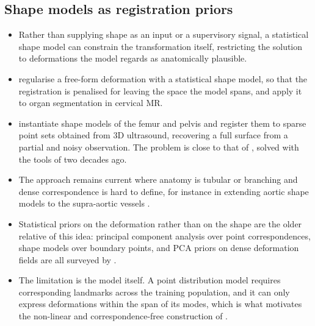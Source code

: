 \subsection{Shape models as registration priors}
\begin{itemize}
\item Rather than supplying shape as an input or a supervisory signal, a statistical shape model can constrain the transformation itself, restricting the solution to deformations the model regards as anatomically plausible.
\item \citet{berendsen2013freeform} regularise a free-form deformation with a statistical shape model, so that the registration is penalised for leaving the space the model spans, and apply it to organ segmentation in cervical MR.
\item \citet{barratt2008instantiation} instantiate shape models of the femur and pelvis and register them to sparse point sets obtained from 3D ultrasound, recovering a full surface from a partial and noisy observation. The problem is close to that of , solved with the tools of two decades ago.
\item The approach remains current where anatomy is tubular or branching and dense correspondence is hard to define, for instance in extending aortic shape models to the supra-aortic vessels \citep{scarpolini2023enabling}.
\item Statistical priors on the deformation rather than on the shape are the older relative of this idea: principal component analysis over point correspondences, shape models over boundary points, and PCA priors on dense deformation fields are all surveyed by \citet{sotiras2013deformable}.
\item The limitation is the model itself. A point distribution model requires corresponding landmarks across the training population, and it can only express deformations within the span of its modes, which is what motivates the non-linear and correspondence-free construction of .
\end{itemize}

